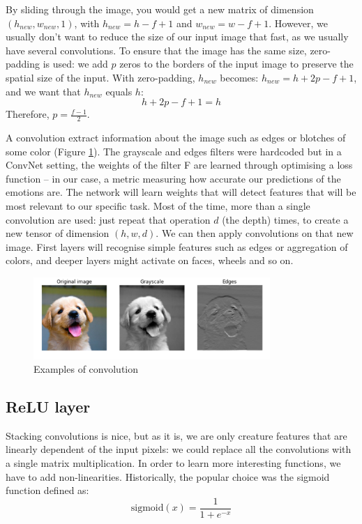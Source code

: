 By sliding through the image, you would get a new matrix of dimension $(h_{new}, w_{new},1)$, with $h_{new}=h-f+1$ and $w_{new}=w-f+1$. However, we usually don't want to reduce the size of our input image that fast, as we usually have several convolutions. To ensure that the image has the same size, zero-padding is used: we add $p$ zeros to the borders of the input image to preserve the spatial size of the input. With zero-padding, $h_{new}$ becomes: $h_{new} =  h + 2p - f + 1$, and we want that $h_{new}$ equals $h$:
\begin{equation}
h + 2p - f + 1 = h
\end{equation}
Therefore, $p=\frac{f-1}{2}$.

A convolution extract information about the image such as edges or blotches of some color (Figure \ref{conv-ex}). The grayscale and edges filters were hardcoded but in a ConvNet setting, the weights of the filter F are learned through optimising a loss function -- in our case, a metric measuring how accurate our predictions of the emotions are. The network will learn weights that will detect features that will be most relevant to our specific task. Most of the time, more than a single convolution are used: just repeat that operation $d$ (the depth) times, to create a new tensor of dimension $(h,w,d)$. We can then apply convolutions on that new image. First layers will recognise simple features such as edges or aggregation of colors, and deeper layers might activate on faces, wheels and so on.

\begin{figure}
\centering
\includegraphics[width=0.8\textwidth]{Images/conv_ex.png}
\caption{Examples of convolution}
\label{conv-ex}
\end{figure}

\subsection{ReLU layer}
Stacking convolutions is nice, but as it is, we are only creature features that are linearly dependent of the input pixels: we could replace all the convolutions with a single matrix multiplication. In order to learn more interesting functions, we have to add non-linearities. Historically, the popular choice was the sigmoid function defined as:
\begin{equation}
\text{sigmoid}(x) = \frac{1}{1+e^{-x}}
\end{equation}

